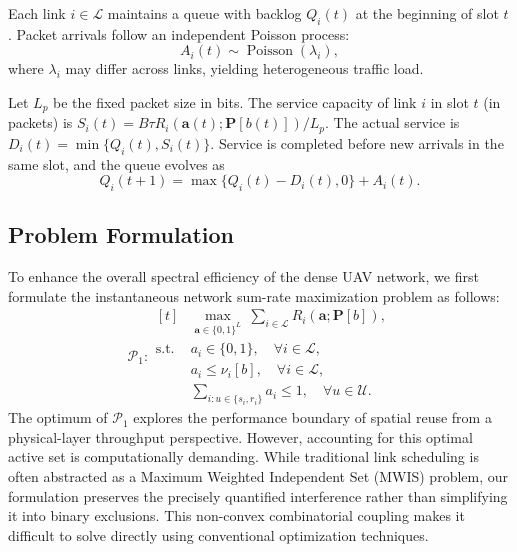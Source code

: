 \documentclass[letterpaper,journal]{IEEEtran}
\begin{document}
	Each link $i \in \mathcal{L}$ maintains a queue with backlog $Q_i(t)$ at the beginning of slot $t$. Packet arrivals follow an independent Poisson process:
	\begin{equation}
		A_i(t) \sim \operatorname{Poisson}(\lambda_i),
		\label{eq:arrival_rate}
	\end{equation}
	where $\lambda_i$ may differ across links, yielding heterogeneous traffic load.
	
	Let $L_p$ be the fixed packet size in bits. The service capacity of link $i$ in slot $t$ (in packets) is $S_i(t) = B \tau R_i(\mathbf{a}(t); \mathbf{P}[b(t)]) / L_p$. The actual service is $D_i(t) = \min\{ Q_i(t), S_i(t) \}$. Service is completed before new arrivals in the same slot, and the queue evolves as
	\begin{equation}
		Q_i(t+1) = \max\{ Q_i(t) - D_i(t), 0 \} + A_i(t).
		\label{eq:queue_update}
	\end{equation}
	
	\subsection{Problem Formulation}
	
	To enhance the overall spectral efficiency of the dense UAV network, we first formulate the instantaneous network sum-rate maximization problem as follows:
	\begin{equation}
		\mathcal{P}_1:
		\begin{aligned}[t]
			& \max_{\mathbf{a} \in \{0,1\}^L} \ \sum_{i \in \mathcal{L}} R_i(\mathbf{a}; \mathbf{P}[b]), \\
			\text{s.t.} \ & a_i \in \{0, 1\}, \quad \forall i \in \mathcal{L}, \\
			& a_i \leq \nu_i[b], \quad \forall i \in \mathcal{L}, \\
			& \sum_{i: u \in \{s_i, r_i\}} a_i \leq 1, \quad \forall u \in \mathcal{U}.
		\end{aligned}
		\label{prob:sum_rate}
	\end{equation}
	The optimum of $\mathcal{P}_1$ explores the performance boundary of spatial reuse from a physical-layer throughput perspective. However, accounting for this optimal active set is computationally demanding. While traditional link scheduling is often abstracted as a Maximum Weighted Independent Set (MWIS) problem, our formulation preserves the precisely quantified interference rather than simplifying it into binary exclusions. This non-convex combinatorial coupling makes it difficult to solve directly using conventional optimization techniques.
	
\end{document}

